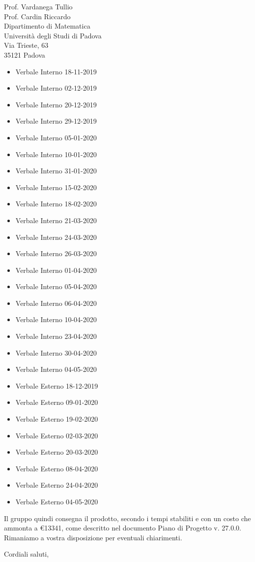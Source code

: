 \documentclass[a4paper,12pt]{letteracdp}
\begin{document}
\begin{letter}{
		Prof. Vardanega Tullio \\
		Prof. Cardin Riccardo \\
		Dipartimento di Matematica \\
		Università degli Studi di Padova \\
		Via Trieste, 63 \\
		35121 Padova}
\begin{itemize}
		\item Verbale Interno 18-11-2019
		\item Verbale Interno 02-12-2019
		\item Verbale Interno 20-12-2019
		\item Verbale Interno 29-12-2019
		\item Verbale Interno 05-01-2020
		\item Verbale Interno 10-01-2020
		\item Verbale Interno 31-01-2020
		\item Verbale Interno 15-02-2020
		\item Verbale Interno 18-02-2020
		\item Verbale Interno 21-03-2020 
		\item Verbale Interno 24-03-2020 
		\item Verbale Interno 26-03-2020 
		\item Verbale Interno 01-04-2020 
		\item Verbale Interno 05-04-2020 
		\item Verbale Interno 06-04-2020 
		\item Verbale Interno 10-04-2020
		\item Verbale Interno 23-04-2020
		\item Verbale Interno 30-04-2020
		\item Verbale Interno 04-05-2020
		
		\item Verbale Esterno 18-12-2019
		\item Verbale Esterno 09-01-2020
		\item Verbale Esterno 19-02-2020
		\item Verbale Esterno 02-03-2020
		\item Verbale Esterno 20-03-2020 
		\item Verbale Esterno 08-04-2020
		\item Verbale Esterno 24-04-2020
		\item Verbale Esterno 04-05-2020		
	\end{itemize}


	\begin{flushleft}
		\noindent Il gruppo quindi consegna il prodotto, secondo i tempi stabiliti e con un costo che ammonta a \euro{13341}, come descritto nel documento Piano di Progetto v. 27.0.0.
	\\
	
	Rimaniamo a vostra disposizione per eventuali chiarimenti.
	\end{flushleft}

	\closing{Cordiali saluti,}
	
\end{letter}	
\end{document}
